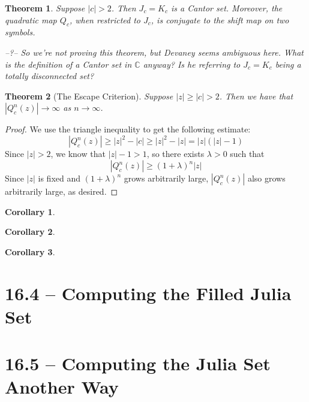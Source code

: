 \documentclass[symmetric]{tufte-handout}
\newtheorem{theorem}{Theorem}
\newtheorem{corollary}{Corollary}
\begin{document}
\begin{theorem}
Suppose $|c| > 2$. Then $J_c=K_c$ is a Cantor set. Moreover, the quadratic map $Q_c$, when restricted to $J_c$, is conjugate to the shift map on two symbols.

--?-- So we're not proving this theorem, but Devaney seems ambiguous here. What is the definition of a Cantor set in $\mathbb{C}$ anyway? Is he referring to $J_c=K_c$ being a totally disconnected set?

\end{theorem}


\begin{theorem}[The Escape Criterion]
Suppose $|z|\geq|c|>2$. Then we have that $|Q_c^n(z)| \rightarrow \infty$ as $n \rightarrow \infty$.

\end{theorem}
\begin{proof}
We use the triangle inequality to get the following estimate:
\begin{equation}
    |Q_c^n(z)| \geq |z|^2 - |c| \geq |z|^2 - |z| = |z|(|z|-1)
\end{equation}
Since $|z| > 2$, we know that $|z|-1>1$, so there exists $\lambda > 0$ such that 
\begin{equation}
    |Q_c^n(z)| \geq (1+\lambda)^n|z|
\end{equation}
Since $|z|$ is fixed and $(1+\lambda)^n$ grows arbitrarily large, $|Q_c^n(z)|$ also grows arbitrarily large, as desired.

\end{proof}

\begin{corollary}

\end{corollary}

\begin{corollary}

\end{corollary}

\begin{corollary}

\end{corollary}






\section{16.4 -- Computing the Filled Julia Set}\label{sec:problem-1}










\section{16.5 -- Computing the Julia Set Another Way}\label{sec:problem-1}
\end{document}

